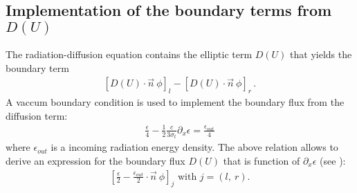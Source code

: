 \subsection{Implementation of the boundary terms from $D(U)$}
%
The radiation-diffusion equation contains the elliptic term $D(U)$ that yields the boundary term 
%
\begin{eqnarray}
\left[D(U)\cdot \vec{n} \ \phi \right]_{l} - \left[D(U)\cdot \vec{n} \ \phi \right]_{r} \, .
\end{eqnarray}
%
A vaccum boundary condition is used to implement the boundary flux from the diffusion term:
%
\begin{eqnarray}
\frac{\epsilon}{4} - \frac{1}{2}\frac{c}{3 \sigma_t} \partial_x \epsilon = \frac{\epsilon_{out}}{4}
\end{eqnarray}
%
where $\epsilon_{out}$ is a incoming radiation energy density. The above relation allows to derive an expression for the boundary flux $D(U)$ that is function of $\partial_x \epsilon$ (see ):
%
\begin{eqnarray}
\left[ \frac{\epsilon}{2} - \frac{\epsilon_{out}}{2} \cdot \vec{n} \ \phi \right]_{j} \text{ with } j = \left( l, \ r \right).
\end{eqnarray}
% 
